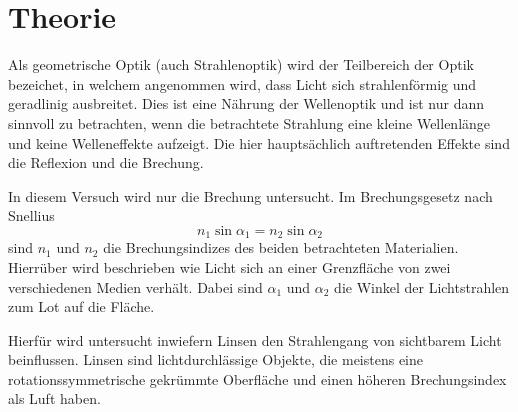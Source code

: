 \section{Theorie}
\label{sec:Theorie}

Als geometrische Optik (auch Strahlenoptik) wird der Teilbereich der Optik bezeichet, in welchem angenommen wird, dass Licht sich strahlenförmig und geradlinig ausbreitet.
Dies ist eine Nährung der Wellenoptik und ist nur dann sinnvoll zu betrachten, wenn die betrachtete Strahlung eine kleine Wellenlänge und keine Welleneffekte aufzeigt.
Die hier hauptsächlich auftretenden Effekte sind die Reflexion und die Brechung.

In diesem Versuch wird nur die Brechung untersucht.
Im Brechungsgesetz nach Snellius
\begin{equation}
    n_1 \sin \alpha_1 = n_2 \sin \alpha_2
    \label{eq:brechungsgesetz}
\end{equation}
sind $n_1$ und $n_2$ die Brechungsindizes des beiden betrachteten Materialien.
Hierrüber wird beschrieben wie Licht sich an einer Grenzfläche von zwei verschiedenen Medien verhält.
Dabei sind $\alpha_1$ und $\alpha_2$ die Winkel der Lichtstrahlen zum Lot auf die Fläche.

Hierfür wird untersucht inwiefern Linsen den Strahlengang von sichtbarem Licht beinflussen.
Linsen sind lichtdurchlässige Objekte, die meistens eine rotationssymmetrische gekrümmte Oberfläche und einen höheren Brechungsindex als Luft haben.

